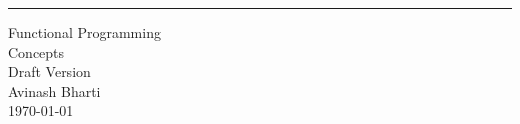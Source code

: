 \begin{titlepage}
\raggedright

\begin{flushright}
    \rule{16cm}{5pt}\vskip1cm
    \begin{bfseries}
        \Huge{Functional Programming \\ Concepts  }\\
        \vspace{1.9cm}
        \small{Draft Version }\\
        \vspace{1.9cm}
       \small{ Avinash Bharti }\\
        \vspace{1.9cm}
        \today\\
    \end{bfseries}
\end{flushright}
\end{titlepage}
